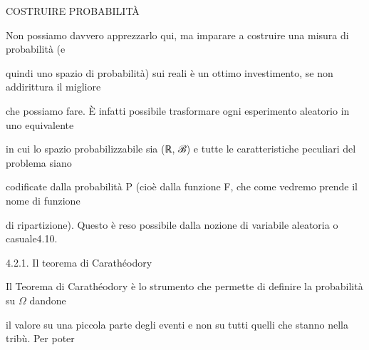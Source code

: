 \documentclass[a4paper,portrait,12pt]{article}
\begin{document}





\begin{flushleft}
COSTRUIRE PROBABILIT\`{A}
\end{flushleft}





\begin{flushleft}
Non possiamo davvero apprezzarlo qui, ma imparare a costruire una misura di probabilit\`{a} (e
\end{flushleft}


\begin{flushleft}
quindi uno spazio di probabilit\`{a}) sui reali \`{e} un ottimo investimento, se non addirittura il migliore
\end{flushleft}


\begin{flushleft}
che possiamo fare. \`{E} infatti possibile trasformare ogni esperimento aleatorio in uno equivalente
\end{flushleft}


\begin{flushleft}
in cui lo spazio probabilizzabile sia (ℝ, ℬ) e tutte le caratteristiche peculiari del problema siano
\end{flushleft}


\begin{flushleft}
codificate dalla probabilit\`{a} P (cio\`{e} dalla funzione F, che come vedremo prende il nome di funzione
\end{flushleft}


\begin{flushleft}
di ripartizione). Questo \`{e} reso possibile dalla nozione di variabile aleatoria o casuale4.10.
\end{flushleft}





\begin{flushleft}
4.2.1. Il teorema di Carath\'{e}odory
\end{flushleft}


\begin{flushleft}
Il Teorema di Carath\'{e}odory \`{e} lo strumento che permette di definire la probabilit\`{a} su $\Omega$ dandone
\end{flushleft}


\begin{flushleft}
il valore su una piccola parte degli eventi e non su tutti quelli che stanno nella tribù. Per poter
\end{flushleft}
\end{document}

